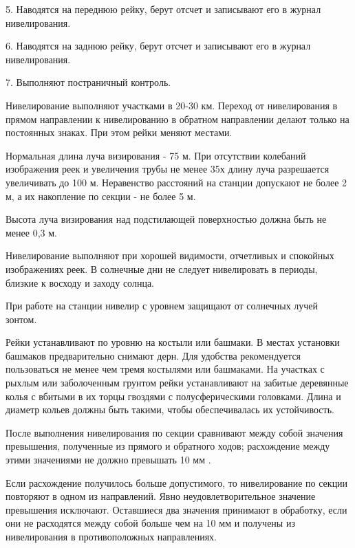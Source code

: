 \documentclass[a4paper]{article}
\begin{document}
{\begin{newpage}
  \par 5. Наводятся на переднюю рейку, берут отсчет и записывают его в журнал нивелирования.
  \par 6. Наводятся на заднюю рейку, берут отсчет и записывают его в журнал нивелирования.
  \par 7. Выполняют постраничный контроль. 
 \par Нивелирование выполняют участками в 20-30 км. Переход от нивелирования в прямом направлении к нивелированию в обратном направлении делают только на постоянных знаках. При этом рейки меняют местами. 
\par Нормальная длина луча визирования - 75 м. При отсутствии колебаний изображения реек и увеличения трубы не менее 35х длину луча разрешается увеличивать до 100 м. Неравенство расстояний на станции допускают не более 2 м, а их накопление по секции - не более 5 м.
\par Высота луча визирования над подстилающей поверхностью должна быть не менее 0,3 м. \par Нивелирование выполняют при хорошей видимости, отчетливых и спокойных изображениях реек. В солнечные дни не следует нивелировать в периоды, близкие к восходу и заходу солнца.
\par При работе на станции нивелир с уровнем защищают от солнечных лучей зонтом.
\par Рейки устанавливают по уровню на костыли или башмаки. В местах установки башмаков предварительно снимают дерн. Для удобства рекомендуется пользоваться не менее чем тремя костылями или башмаками. На участках с рыхлым или заболоченным грунтом рейки устанавливают на забитые деревянные колья с вбитыми в их торцы гвоздями с полусферическими головками. Длина и диаметр кольев должны быть такими, чтобы обеспечивалась их устойчивость.
\par После выполнения нивелирования по секции сравнивают между собой значения превышения, полученные из прямого и обратного ходов; расхождение между этими значениями не должно превышать 10 мм . 
\par Если расхождение получилось больше допустимого, то нивелирование по секции повторяют в одном из направлений. Явно неудовлетворительное значение превышения исключают. Оставшиеся два значения принимают в обработку, если они не расходятся между собой больше чем на 10 мм и получены из нивелирования в противоположных направлениях.
\end{newpage}
\begin{newpage}
\begin{center}

\end{center}
\end{newpage}}
\end{document}
